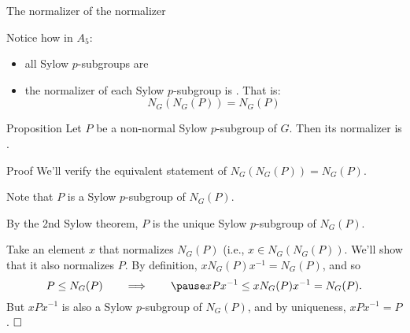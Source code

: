 \documentclass[8pt, handout]{beamer}
\newcommand{\Pause}{\pause}      %
\begin{document}
\begin{frame}{The normalizer of the normalizer}

  Notice how in $A_5$:
  \begin{itemize}
  \item all Sylow $p$-subgroups are  \Pause
  \item the normalizer of each Sylow $p$-subgroup is . \Pause That is:
    \[
    N_G(N_G(P))=N_G(P)
    \]
  \end{itemize}

  \vspace{-2mm}\Pause
  
  \begin{block}{Proposition}
    Let $P$ be a non-normal Sylow $p$-subgroup of $G$. Then its
    normalizer is .
  \end{block}
  
  \begin{exampleblock}{Proof} \Pause
    We'll verify the equivalent statement of
    $N_G(N_G(P))=N_G(P)$. \medskip\pause

    Note that $P$ is a  Sylow $p$-subgroup of
    $N_G(P)$. \medskip\Pause

    By the 2nd Sylow theorem, $P$ is the unique Sylow $p$-subgroup of
    $N_G(P)$. \medskip\pause
    
    Take an element $x$ that normalizes $N_G(P)$ (i.e., $x\in
    N_G(N_G(P))$. \Pause We'll show that it also normalizes $P$. \Pause By
    definition, $xN_G(P)x^{-1}=N_G(P)$, and so
    \[
    P\leq N_G(P)\qquad\Longrightarrow\qquad\Pause
    xPx^{-1}\leq xN_G(P)x^{-1}=N_G(P).
    \]
    \pause But $xPx^{-1}$ is also a Sylow $p$-subgroup of $N_G(P)$,
    and by uniqueness, $xPx^{-1}=P$. $\hfill\Box$
  \end{exampleblock}

\end{frame}

\end{document}
